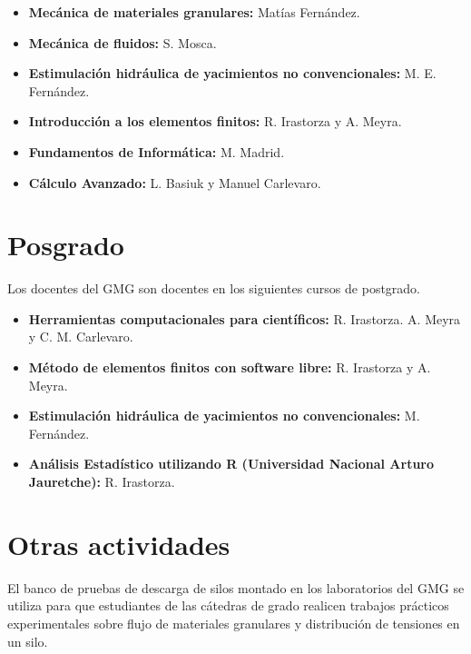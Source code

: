 \documentclass[a4paper,11pt,twoside,final,titlepage,onecolumn,openright]{report}
\begin{document}
\begin{itemize}
 \item {\bf Mecánica de materiales granulares:} Matías Fernández.
 \item {\bf Mecánica de fluidos:} S. Mosca.
 \item {\bf Estimulación hidráulica de yacimientos no convencionales:} M. E. Fernández.
 \item {\bf Introducción a los elementos finitos:} R. Irastorza y A. Meyra.
 \item {\bf Fundamentos de Informática:} M. Madrid.
 \item {\bf Cálculo Avanzado:} L. Basiuk y Manuel Carlevaro.
\end{itemize}




\section{Posgrado}

Los docentes del GMG son docentes en los siguientes cursos de postgrado.

\begin{itemize}
 \item {\bf Herramientas computacionales para científicos:} R. Irastorza. A. Meyra y C. M. Carlevaro.
 \item \textbf{Método de elementos finitos con software libre:} R. Irastorza y A. Meyra.
 \item \textbf{Estimulación hidráulica de yacimientos no convencionales:} M. Fernández.
 \item {\bf Análisis Estadístico utilizando R (Universidad Nacional Arturo Jauretche):} R. Irastorza.
\end{itemize}

\section{Otras actividades}

El banco de pruebas de descarga de silos montado en los laboratorios del GMG se utiliza para que estudiantes de las cátedras de grado realicen trabajos prácticos experimentales sobre flujo de materiales granulares y distribución de tensiones en un silo. 
\end{document}
